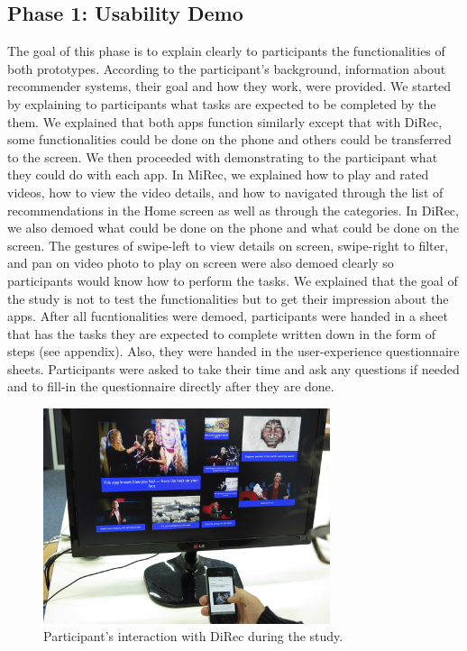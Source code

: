 \subsection{Phase 1: Usability Demo}
The goal of this phase is to explain clearly to participants the functionalities
of both prototypes. According to the participant’s background, information about
recommender systems, their goal and how they work, were provided. We started by
explaining to participants what tasks are expected to be completed by the them.
We explained that both apps function similarly except that with DiRec, some
functionalities could be done on the phone and others could be transferred to
the screen. We then proceeded with demonstrating to the participant what they
could do with each app. In MiRec, we explained how to play and rated videos, how
to view the video details, and how to navigated through the list of
recommendations in the Home screen as well as through the categories. In DiRec,
we also demoed what could be done on the phone and what could be done on the
screen. The gestures of swipe-left to view details on screen, swipe-right to
filter, and pan on video photo to play on screen were also demoed clearly so
participants would know how to perform the tasks. We explained that the goal of
the study is not to test the functionalities but to get their impression about
the apps. After all fucntionalities were demoed, participants were handed in a
sheet that has the tasks they are expected to complete written down in the form of steps (see appendix). Also, they were
handed in the user-experience questionnaire sheets. Participants were asked to
take their time and ask any questions if needed and to fill-in the questionnaire
directly after they are done.
\begin{figure}[t]
\includegraphics[width=0.75\textwidth, center, center]{figures/IMG_6806}
\caption{Participant's interaction with DiRec during the study.}
\label{fig:figure51}
\end{figure}
